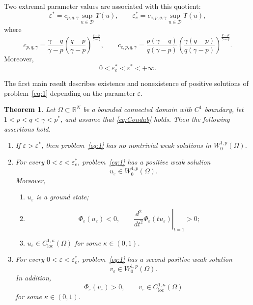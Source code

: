 \documentclass[preprint,11pt]{elsarticle}
\numberwithin{equation}{section}
\newtheorem{theorem}{Theorem}[section]
\begin{document}
Two extremal parameter values are associated with this quotient:
\[
\varepsilon^*
=
c_{p,q,\gamma}
\sup_{u\in\mathcal D}\Upsilon(u),
\qquad
\varepsilon_e^*
=
c_{e,p,q,\gamma}
\sup_{u\in\mathcal D}\Upsilon(u),
\]
where
\begin{equation}\label{eq:c-pq-intro}
	c_{p,q,\gamma}
	=
	\frac{\gamma-q}{\gamma-p}
	\left(
	\frac{q-p}{\gamma-p}
	\right)^{\frac{q-p}{\gamma-q}},
	\qquad
	c_{e,p,q,\gamma}
	=
	\frac{p(\gamma-q)}{q(\gamma-p)}
	\left(
	\frac{\gamma(q-p)}{q(\gamma-p)}
	\right)^{\frac{q-p}{\gamma-q}} .
\end{equation}
Moreover,
\[
0<\varepsilon_e^*<\varepsilon^*<+\infty .
\]

The first main result describes existence and nonexistence of positive
solutions of problem~\eqref{eq:1} depending on the parameter
\(\varepsilon\).

\begin{theorem}\label{thm1}
	Let \(\Omega\subset\mathbb R^N\) be a bounded connected domain with
	\(C^1\) boundary, let \(1<p<q<\gamma<p^*\), and assume that
	\eqref{eq:Condab} holds. Then the following assertions hold.
	
	\begin{enumerate}
		\item[\textbf{(1)}]
		If \(\varepsilon>\varepsilon^*\), then problem~\eqref{eq:1} has no
		nontrivial weak solutions in \(W^{1,p}_0(\Omega)\).
		
		\item[\textbf{(2)}]
		For every \(0<\varepsilon<\varepsilon_e^*\), problem~\eqref{eq:1}
		has a positive weak solution
		\[
		u_\varepsilon\in W^{1,p}_0(\Omega).
		\]
		Moreover,
		\begin{enumerate}
			\item[(i)]
			\(u_\varepsilon\) is a ground state;
			
			\item[(ii)]
			\[
			\Phi_\varepsilon(u_\varepsilon)<0,
			\qquad
			\left.
			\frac{d^2}{dt^2}\Phi_\varepsilon(tu_\varepsilon)
			\right|_{t=1}
			>0;
			\]
			
			\item[(iii)]
			\(u_\varepsilon\in C^{1,\kappa}_{\mathrm{loc}}(\Omega)\)
			for some \(\kappa\in(0,1)\).
		\end{enumerate}
		
		\item[\textbf{(3)}]
		For every \(0<\varepsilon<\varepsilon_e^*\), problem~\eqref{eq:1}
		has a second positive weak solution
		\[
		v_\varepsilon\in W^{1,p}_0(\Omega).
		\]
		In addition,
		\[
		\Phi_\varepsilon(v_\varepsilon)>0,
		\qquad
		v_\varepsilon\in C^{1,\kappa}_{\mathrm{loc}}(\Omega)
		\]
		for some \(\kappa\in(0,1)\).
	\end{enumerate}
\end{theorem}
\end{document}
